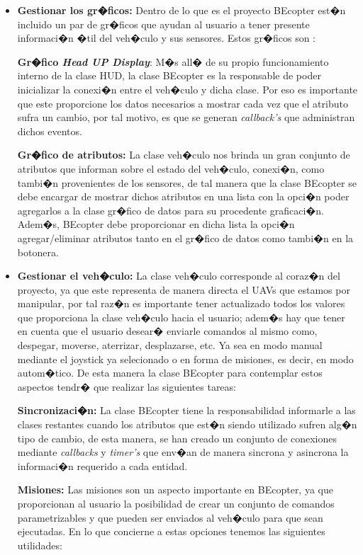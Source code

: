 \begin{itemize}
	
	\item \textbf{Gestionar los gr�ficos: }  Dentro de lo que es el proyecto BEcopter est�n incluido un par de gr�ficos que ayudan al usuario a tener presente informaci�n �til del veh�culo y sus sensores. Estos gr�ficos son :
	
	\subitem \textbf{Gr�fico \textit{Head UP Display}}: M�s all� de su propio funcionamiento interno de la clase HUD, la clase BEcopter es la responsable de poder inicializar la conexi�n entre el veh�culo y dicha clase. Por eso es importante que este proporcione los datos necesarios a mostrar cada vez que el atributo sufra un cambio, por tal motivo, es que se generan \textit{callback's} que administran dichos eventos.
	
	\subitem \textbf{Gr�fico de atributos: } La clase veh�culo nos brinda un gran conjunto de atributos que informan sobre el estado del veh�culo, conexi�n, como tambi�n provenientes de los sensores, de tal manera que la clase BEcopter se debe encargar de mostrar dichos atributos en una lista con la opci�n poder agregarlos a la clase gr�fico de datos para su procedente graficaci�n. Adem�s, BEcopter debe proporcionar en dicha lista la opci�n agregar/eliminar atributos tanto en el gr�fico de datos como tambi�n en la botonera.
	
	
	\item \textbf{Gestionar el veh�culo: } La clase veh�culo corresponde al coraz�n del proyecto, ya que este representa de manera directa el UAVs que estamos por manipular, por tal raz�n es importante tener actualizado todos los valores que proporciona la clase veh�culo hacia el usuario; adem�s hay que tener en cuenta que el usuario desear� enviarle comandos al mismo como, despegar, moverse, aterrizar, desplazarse, etc. Ya sea en modo manual mediante el joystick ya selecionado o en forma de misiones, es decir, en modo autom�tico. De esta manera la clase BEcopter para contemplar estos aspectos tendr� que realizar las siguientes tareas:
	
	\subitem \textbf{Sincronizaci�n: } La clase BEcopter tiene la responsabilidad informarle a las clases restantes cuando los atributos que est�n siendo utilizado sufren alg�n tipo de cambio, de esta manera, se han creado un conjunto de conexiones mediante \textit{callbacks} y \textit{timer's} que env�an de manera sincrona y asincrona la informaci�n requerido a cada entidad.
	
	\subitem \textbf{Misiones: } Las misiones son un aspecto importante en BEcopter, ya que proporcionan al usuario la posibilidad de crear un conjunto de comandos parametrizables y que pueden ser enviados al veh�culo para que sean ejecutadas. En lo que concierne a estas opciones tenemos las siguientes utilidades:
	

\end{itemize}
